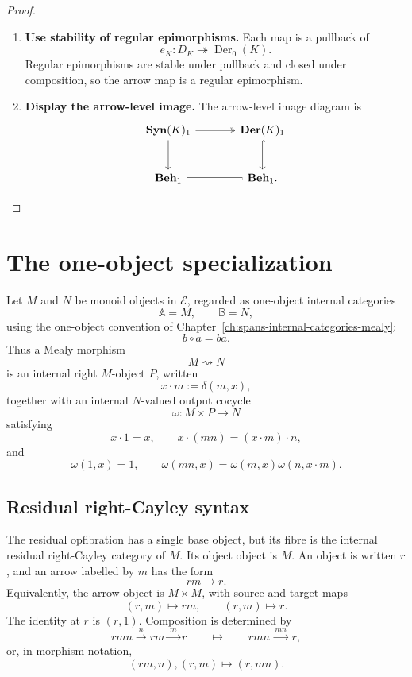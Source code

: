 \begin{proof}
\begin{enumerate}
        \item \textbf{Use stability of regular epimorphisms.} Each map is a pullback of
        \[
            e_K:D_K\twoheadrightarrow\operatorname{Der}_0(K).
        \]
        Regular epimorphisms are stable under pullback and closed under composition, so the arrow map is a regular epimorphism.

        \item \textbf{Display the arrow-level image.} The arrow-level image diagram is
        \[
            \begin{tikzcd}[column sep=large, row sep=large]
                    \mathbf{Syn}(K)_1
                        \arrow[r, two heads]
                        \arrow[d]
                &
                    \mathbf{Der}(K)_1
                        \arrow[d, hook]
                \\
                    \mathbf{Beh}_1
                        \arrow[r, equal]
                &
                    \mathbf{Beh}_1.
            \end{tikzcd}
        \]
    \end{enumerate}
\end{proof}

\section{The one-object specialization}
\label{sec:behaviour-one-object-specialization}

Let \(M\) and \(N\) be monoid objects in \(\mathcal E\), regarded as
one-object internal categories
\[
    \mathbb A=M,
    \qquad
    \mathbb B=N,
\]
using the one-object convention of
Chapter~\ref{ch:spans-internal-categories-mealy}:
\[
    b\circ a=ba.
\]
Thus a Mealy morphism
\[
    M\rightsquigarrow N
\]
is an internal right \(M\)-object \(P\), written
\[
    x\cdot m:=\delta(m,x),
\]
together with an internal \(N\)-valued output cocycle
\[
    \omega:M\times P\to N
\]
satisfying
\[
    x\cdot 1=x,
    \qquad
    x\cdot(mn)=(x\cdot m)\cdot n,
\]
and
\[
    \omega(1,x)=1,
    \qquad
    \omega(mn,x)=\omega(m,x)\omega(n,x\cdot m).
\]

\subsection{Residual right-Cayley syntax}
\label{subsec:one-object-residual-cayley-syntax}

The residual opfibration has a single base object, but its fibre is the
internal residual right-Cayley category of \(M\). Its object object is \(M\).
An object is written \(r\), and an arrow labelled by \(m\) has the form
\[
    rm\longrightarrow r.
\]
Equivalently, the arrow object is \(M\times M\), with source and target maps
\[
    (r,m)\longmapsto rm,
    \qquad
    (r,m)\longmapsto r.
\]
The identity at \(r\) is \((r,1)\). Composition is determined by
\[
    rmn \xrightarrow{\;n\;} rm \xrightarrow{\;m\;} r
    \qquad\longmapsto\qquad
    rmn \xrightarrow{\;mn\;} r,
\]
or, in morphism notation,
\[
    (rm,n),(r,m)\longmapsto (r,mn).
\]

